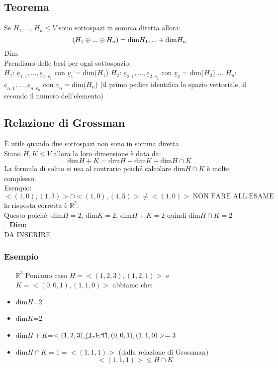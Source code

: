 \subsection{Teorema}
Se $H_1,...,H_n \le V$ sono sottospazi in somma diretta allora:
$$ \text(H_1 \oplus ... \oplus H_n) = \text{dim}H_1,...+\text{dim}H_n $$
Dim:\\
Prendiano delle basi per ogni sottospazio:\\
$H_1$: $\underline{e}_{1,1},...,\underline{e}_{1,v_1}$ con $\underline{v}_1=$dim($H_1$)
$H_2$: $\underline{e}_{2,1},...,\underline{e}_{2,v_2}$ con $\underline{v}_2=$dim($H_2$)
...
$H_n$: $\underline{e}_{n,1},...,\underline{e}_{n,v_n}$ con $\underline{v}_n=$dim($H_n$)
(il primo pedice identifica lo spazio vettoriale, il secondo il numero dell’elemento)\\


\subsection{Relazione di Grossman}
È utile quando due sottospazi non sono in somma diretta.\\
Siano $H,K \le V$ allora la loro dimensione è data da:
$$ \text{dim}H+K = \text{dim}H +\text{dim}K - \text{dim} H \cap K$$
La formula di solito si usa al contrario poiché calcolare $\text{dim} H \cap K$ è molto complesso.\\
Esempio:
$ <(1,0),(1,3)> \cap <(1,0),(4,5)> \neq <(1,0)> \; \text{NON FARE ALL'ESAME} $ la risposta corretta è $\mathbb{R}^2$.\\
Questo poiché: $\text{dim}H = 2$, $\text{dim}K = 2$, $\text{dim}H+K = 2$ quindi $\text{dim} H \cap K = 2$.\
\textbf{Dim:}\\
DA INSERIRE
\subsubsection{Esempio}
\begin{itemize}
\item[$\mathbb{R}^3$] Poniamo caso $H = <(1,2,3),(1,2,1)>$ e $K = <(0,0,1),(1,1,0)>$ abbiamo che:
	\item dim$H$=2
	\item dim$K$=2
	\item dim$H+K$=$<(1,2,3),\cancel{(1,1,1)},(0,0,1),(1,1,0)> = 3$
	\item dim$H \cap K = 1 = <(1,1,1)>$ (dalla relazione di Grossman)
	$$ <(1,1,1)> \le H \cap K $$
\end{itemize}



